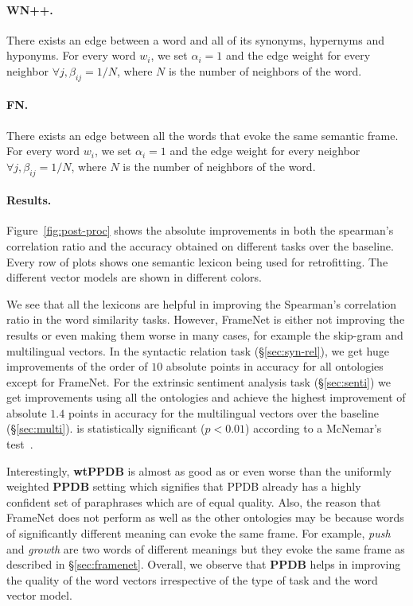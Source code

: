 \documentclass[11pt]{article}
\begin{document}
\paragraph{WN++.} There exists an edge between a word and all of its synonyms, 
hypernyms and hyponyms. For every word $w_i$, we set $\alpha_i = 1$ and the edge weight
for every neighbor $\forall j, \beta_{ij} = 1/N$, where $N$ is the number of neighbors of the word. 

\paragraph{FN.} There exists an edge between all the words that evoke the same 
semantic frame. For every word $w_i$, we set $\alpha_i = 1$ and the edge weight
for every neighbor $\forall j, \beta_{ij} = 1/N$, where $N$ is the number of neighbors of the word. 

\paragraph{Results.} Figure~\ref{fig:post-proc} shows the absolute improvements
in both the spearman's correlation ratio and the accuracy obtained on different
tasks over the baseline. Every row of plots shows one semantic lexicon being used
for retrofitting. The different vector models are shown in different colors. 

We see that all the lexicons are helpful in improving
the Spearman's correlation ratio in the word similarity tasks. However, FrameNet is
either not improving the results or even making them worse in many cases, for example the skip-gram and multilingual vectors. In the syntactic relation task (\S\ref{sec:syn-rel}), 
we get huge improvements of the order of $10$ absolute points
in accuracy for all ontologies except for FrameNet. For the extrinsic sentiment analysis task (\S\ref{sec:senti}) we get improvements using all the ontologies and achieve the highest improvement of absolute $1.4$ points in accuracy for the multilingual vectors over the baseline (\S\ref{sec:multi}).
is statistically significant ($p<0.01$) according to a McNemar's test~\cite{Dietterich98approximatestatistical}.

Interestingly, \textbf{wtPPDB} is almost as good as or even worse than 
the uniformly weighted \textbf{PPDB} 
setting which signifies that PPDB already has a highly confident
set of paraphrases which are of equal quality. 
Also, the reason that FrameNet does not perform as well as the other 
ontologies may be because words of significantly different meaning can evoke the 
same frame. For example, \textit{push} and \textit{growth} are two words of 
different meanings but they evoke the same frame as described in \S\ref{sec:framenet}.
Overall, we observe that \textbf{PPDB} helps in improving the quality of the word vectors
irrespective of the type of task and the word vector model.
\end{document}
